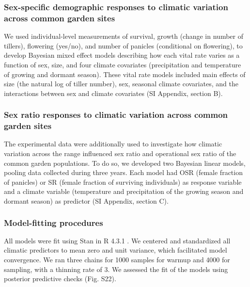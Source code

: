 \documentclass[9pt,twocolumn,twoside,lineno]{pnas-new}
\newcommand{\tom}[2]{{\color{red}{#1}}\footnote{\textit{\color{red}{#2}}}}
\newcommand{\revise}[1]{{\color{Mahogany}{#1}}}
\begin{document}
\subsubsection*{Sex-specific demographic responses to climatic variation across common garden sites}
We used individual-level measurements of survival, growth (change in number of tillers), flowering (yes/no), and number of panicles (conditional on flowering), to develop Bayesian mixed effect models describing how each vital rate varies as a function of sex, size, and four climate covariates (precipitation and temperature of growing and dormant season). 
These vital rate models included main effects of size (the natural log of tiller number), sex, seasonal climate covariates, and the interactions between sex and climate covariates (SI Appendix, section B). 
\revise{We included second-order terms for the climate covariates to account for potentially non-monotonic responses (SI Appendix, section B).}

\subsubsection*{Sex ratio responses to climatic variation across common garden sites}
The experimental data were additionally used to investigate how climatic variation across the range influenced sex ratio and operational sex ratio of the common garden populations. 
To do so, we developed two Bayesian linear models, pooling data collected during three years.
Each model had OSR (female fraction of panicles) or SR (female fraction of surviving individuals) as response variable and a climate variable (temperature and precipitation of the growing season and dormant season) as predictor (SI Appendix, section C). 


\subsubsection*{Model-fitting procedures}
All models were fit using Stan \citep{rstan} in R 4.3.1 \citep{RCoreteam}.
We centered and standardized all climatic predictors to mean zero and unit variance, which facilitated model convergence.
We ran three chains for 1000 samples for warmup and 4000 for sampling, with a thinning rate of 3.
We assessed the fit of the models using posterior predictive checks \citep{piironen2017comparison} (Fig. S22).
 
\end{document}
